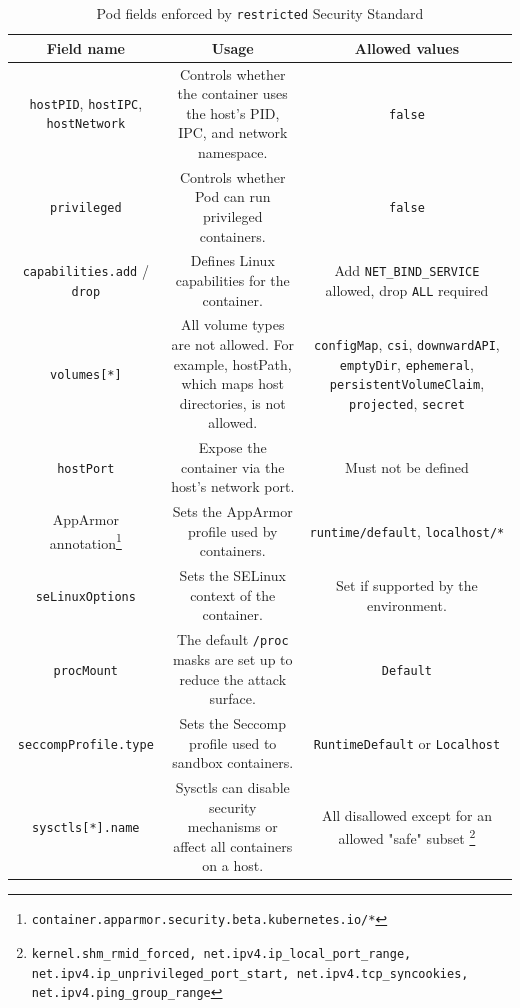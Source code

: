 \documentclass[english, 12pt, a4paper, sci, utf8, a-2b, online]{aaltothesis}
\begin{document}
\begin{table}[H]
  \centering
  \caption{Pod fields enforced by \lstinline{restricted} Security Standard}
  \label{table:pod-hardening}
  \sffamily
  \small
  \begin{minipage}{\textwidth}
  \renewcommand{\thempfootnote}{\arabic{mpfootnote}}
  \begin{tabularx}{\textwidth}{CCC}
    \hline
    \textbf{Field name} & \textbf{Usage} & \textbf{Allowed values}\\ \hline
    \lstinline{hostPID}, \lstinline{hostIPC}, \lstinline{hostNetwork} & Controls whether the container uses the host's PID, IPC, and network namespace. & \lstinline{false} \\ \hline
    \lstinline{privileged} & Controls whether Pod can run privileged containers. & \lstinline{false} \\ \hline
    \lstinline{capabilities.add} / \lstinline{drop} & Defines Linux capabilities for the container. & Add \lstinline{NET_BIND_SERVICE} allowed, drop \lstinline{ALL} required \\ \hline
    \lstinline{volumes[*]} & All volume types are not allowed. For example, hostPath, which maps host directories, is not allowed. & \lstinline{configMap}, \lstinline{csi}, \lstinline{downwardAPI}, \lstinline{emptyDir}, \lstinline{ephemeral}, \lstinline{persistentVolumeClaim}, \lstinline{projected}, \lstinline{secret} \\ \hline
    \lstinline{hostPort} & Expose the container via the host's network port. & Must not be defined \\ \hline
    AppArmor annotation\footnote{\lstinline{container.apparmor.security.beta.kubernetes.io/*}} & Sets the AppArmor profile used by containers. & \lstinline{runtime/default}, \lstinline{localhost/*} \\ \hline
    \lstinline{seLinuxOptions} & Sets the SELinux context of the container. & Set if supported by the environment. \\ \hline
    \lstinline{procMount} & The default \lstinline{/proc} masks are set up to reduce the attack surface. & \lstinline{Default} \\ \hline
    \lstinline{seccompProfile.type} & Sets the Seccomp profile used to sandbox containers. & \lstinline{RuntimeDefault} or \lstinline{Localhost} \\ \hline
    \lstinline{sysctls[*].name} & Sysctls can disable security mechanisms or affect all containers on a host. & All disallowed except for an allowed "safe" subset \footnote{\lstinline{kernel.shm_rmid_forced, net.ipv4.ip_local_port_range, net.ipv4.ip_unprivileged_port_start, net.ipv4.tcp_syncookies, net.ipv4.ping_group_range}} \\ \hline

\end{tabularx}
\end{minipage}
\end{table}
\end{document}
